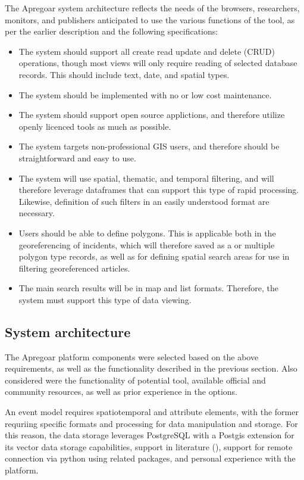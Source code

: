The Apregoar system architecture reflects the needs of the browsers, researchers, monitors, and publishers anticipated to use the various functions of the tool, as per the earlier description and the following specifications:

\begin{itemize}
	\item{} The system should support all create read update and delete (CRUD) operations, though most views will only require reading of selected database records. This should include text, date, and spatial types.
	\item{} The system should be implemented with no or low cost maintenance.
	\item{} The system should support open source applictions, and therefore utilize openly licenced tools as much as possible.
	\item{} The system targets non-professional GIS users, and therefore should be straightforward and easy to use.
	\item{} The system will use spatial, thematic, and temporal filtering, and will therefore leverage dataframes that can support this type of rapid processing. Likewise, definition of such filters in an easily understood format are necessary.
	\item{} Users should be able to define polygons. This is applicable both in the georeferencing of incidents, which will therefore saved as a or multiple polygon type records, as well as for defining spatial search areas for use in filtering georeferenced articles.
	\item{} The main search results will be in map and list formats. Therefore, the system must support this type of data viewing.
	
\end{itemize}
\subsection{System architecture}
The Apregoar platform components were selected based on the above requirements, as well as the functionality described in the previous section. Also considered were the functionality of potential tool, available official and community resources, as well as prior experience in the options.

An event model requires spatiotemporal and attribute elements, with the former requriing specific formats and processing for data manipulation and storage. For this reason, the data storage leverages PostgreSQL with a Postgis extension for its vector data storage capabilities, support in literature (\cite{Oliveira2021,Bhattacharya2018,Teitler2008,Sami2019}), support for remote connection via python using related packages, and personal experience with the platform. 

